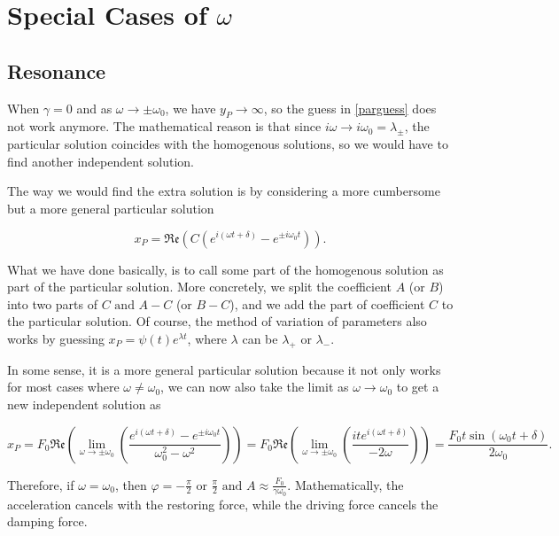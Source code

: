 \documentclass[english,a4paper,12pt]{report}
\begin{document}
\section{Special Cases of \(\omega \) }

\subsection{Resonance}

When \(\gamma = 0\) and as \(\omega \to \pm \omega _{0}\), we have \(y_{P} \to \infty  \), so the guess in \cref{parguess} does not work anymore. The mathematical reason is that since \(i \omega \to  i \omega _{0} = \lambda _{\pm } \), the particular solution coincides with the homogenous solutions, so we would have to find another independent solution. 

The way we would find the extra solution is by considering a more cumbersome but a more general particular solution 

\begin{equation}
    x_{P} =  \mathfrak{Re} (C(e^{i(\omega t+\delta )} - e^{\pm i\omega _{0}t  } ) ). 
\end{equation}

What we have done basically, is to call some part of the homogenous solution as part of the particular solution. More concretely, we split the coefficient \(A \) (or \(B\)) into two parts of \(C \text { and } A-C\) (or \(B-C\)), and we add the part of coefficient \(C\) to the particular solution. Of course, the method of variation of parameters also works by guessing \(x_{P} = \psi (t)e^{\lambda t}\), where \(\lambda \) can be \(\lambda _{+} \text { or } \lambda _{-}  \).

In some sense, it is a more general particular solution because it not only works for most cases where \(\omega \neq \omega _{0} \), we can now also take the limit as \(\omega \to \omega _{0} \) to get a new independent solution as   


\begin{equation}
    x_{P} = F_0 \mathfrak{Re} \left( \lim_{\omega  \to \pm \omega _{0}  } \left(  \frac{e^{i (\omega t+\delta )} - e^{\pm i \omega _{0}  t }  }{\omega _{0}^2-\omega ^2 } \right)\right) = F_0 \mathfrak{Re} \left( \lim_{\omega  \to \pm \omega _{0} } \left(\frac{ite^{i (\omega t+\delta )} }{-2\omega } \right) \right)= \frac{F_0 t \sin (\omega _{0}t +\delta )}{2 \omega _{0} }.
\end{equation}

Therefore, if \(\omega = \omega _{0} \), then \(\displaystyle \varphi = -\frac{\pi }{2} \text { or } \frac{\pi }{2} \text { and } A\approx \frac{F_0 }{\gamma \omega _{0} }  \). Mathematically, the acceleration cancels with the restoring force, while the driving force cancels the damping force.
\end{document}
